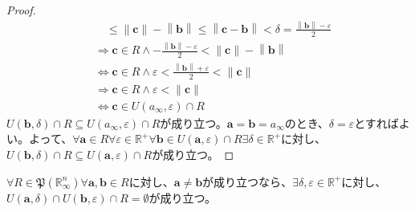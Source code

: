 \documentclass[dvipdfmx]{jsarticle}
\begin{document}
\begin{proof}
\begin{align*}
&\quad \leq \left\| \mathbf{c} \right\| - \left\| \mathbf{b} \right\| \leq \left\| \mathbf{c} - \mathbf{b} \right\| < \delta = \frac{\left\| \mathbf{b} \right\| - \varepsilon}{2}\\
&\Rightarrow \mathbf{c} \in R \land - \frac{\left\| \mathbf{b} \right\| - \varepsilon}{2} < \left\| \mathbf{c} \right\| - \left\| \mathbf{b} \right\|\\
&\Leftrightarrow \mathbf{c} \in R \land \varepsilon < \frac{\left\| \mathbf{b} \right\| + \varepsilon}{2} < \left\| \mathbf{c} \right\|\\
&\Rightarrow \mathbf{c} \in R \land \varepsilon < \left\| \mathbf{c} \right\|\\
&\Leftrightarrow \mathbf{c} \in U\left( a_{\infty},\varepsilon \right) \cap R
\end{align*}
$U\left( \mathbf{b},\delta \right) \cap R \subseteq U\left( a_{\infty},\varepsilon \right) \cap R$が成り立つ。$\mathbf{a} = \mathbf{b} = a_{\infty}$のとき、$\delta = \varepsilon$とすればよい。よって、$\forall\mathbf{a} \in R\forall\varepsilon \in \mathbb{R}^{+}\forall\mathbf{b} \in U\left( \mathbf{a},\varepsilon \right) \cap R\exists\delta \in \mathbb{R}^{+}$に対し、$U\left( \mathbf{b},\delta \right) \cap R \subseteq U\left( \mathbf{a},\varepsilon \right) \cap R$が成り立つ。
\end{proof}
\begin{thm}\label{4.1.3.5}
$\forall R \in \mathfrak{P}\left( \mathbb{R}_{\infty}^{n} \right)\forall\mathbf{a},\mathbf{b} \in R$に対し、$\mathbf{a} \neq \mathbf{b}$が成り立つなら、$\exists\delta,\varepsilon \in \mathbb{R}^{+}$に対し、$U\left( \mathbf{a},\delta \right) \cap U\left( \mathbf{b},\varepsilon \right) \cap R = \emptyset$が成り立つ。
\end{thm}
\end{document}
